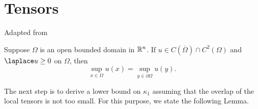 
\section{Tensors}%
\label{sec:tensors_appendix}



Adapted from \cite[Thm. 2.1]{Taylor}
\begin{theorem}%
  \label{thm:ana.max_principle}
  Suppose $\Omega$ is an open bounded domain in ${\mathbb{R}}^n$.
  If $u \in C(\overline{\Omega}) \cap C^2(\Omega)$ and $\laplace u \ge 0$ on $\Omega$, then
  \[
    \sup_{x \in \Omega} u(x) = \sup_{y \in \partial\Omega} u(y).
  \]
\end{theorem}


The next step is to derive a lower bound on $\kappa_1$ assuming that the overlap of the local tensors is not too small.
For this purpose, we state the following Lemma.

